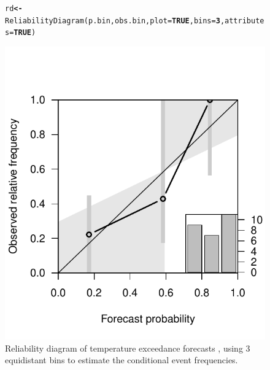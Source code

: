 \documentclass[article]{jss}\usepackage[]{graphicx}\usepackage[]{color}
\makeatletter
\def\maxwidth{ %
  \ifdim\Gin@nat@width>\linewidth
    \linewidth
  \else
    \Gin@nat@width
  \fi
}
\newcommand{\hlnum}[1]{\textcolor[rgb]{0.502,0,0.502}{\textbf{#1}}}%
\newcommand{\hlstd}[1]{\textcolor[rgb]{0,0,0}{#1}}%
\newcommand{\hlkwb}[1]{\textcolor[rgb]{0.502,0.502,0.753}{\textbf{#1}}}%
\newcommand{\hlkwc}[1]{\textcolor[rgb]{0,0.502,0.753}{#1}}%
\newcommand{\hlkwd}[1]{\textcolor[rgb]{0,0.267,0.4}{#1}}%
\newenvironment{kframe}{%
 \def\at@end@of@kframe{}%
 \ifinner\ifhmode%
  \def\at@end@of@kframe{\end{minipage}}%
  \begin{minipage}{\columnwidth}%
 \fi\fi%
 \def\FrameCommand##1{\hskip\@totalleftmargin \hskip-\fboxsep
 \colorbox{shadecolor}{##1}\hskip-\fboxsep
     \hskip-\linewidth \hskip-\@totalleftmargin \hskip\columnwidth}%
 \MakeFramed {\advance\hsize-\width
   \@totalleftmargin\z@ \linewidth\hsize
   \@setminipage}}%
 {\par\unskip\endMakeFramed%
 \at@end@of@kframe}
\newenvironment{knitrout}{}{} %
\makeatother
\begin{document}
\begin{figure}
\begin{center}
%
\begin{knitrout}
\color{fgcolor}\begin{kframe}
\begin{alltt}
\hlstd{rd} \hlkwb{<-} \hlkwd{ReliabilityDiagram}\hlstd{(p.bin, obs.bin,} \hlkwc{plot}\hlstd{=}\hlnum{TRUE}\hlstd{,} \hlkwc{bins}\hlstd{=}\hlnum{3}\hlstd{,} \hlkwc{attributes}\hlstd{=}\hlnum{TRUE}\hlstd{)}
\end{alltt}
\end{kframe}
\includegraphics[width=\maxwidth]{figure/reldiag-1} 

\end{knitrout}
%
\end{center}
\caption{Reliability diagram of temperature exceedance forecasts , using 3 equidistant bins to estimate the conditional event frequencies.} 
\label{reldiag-plot}
\end{figure}
\end{document}
